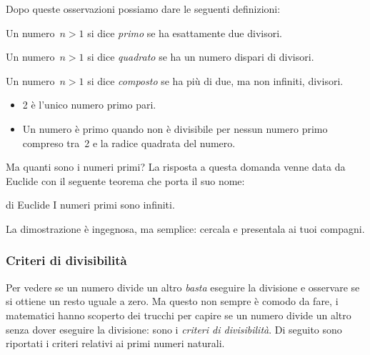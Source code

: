 Dopo queste osservazioni possiamo dare le seguenti definizioni:

\begin{definizione}{}{}
 Un numero~\(n>1\) si dice \emph{primo} se ha esattamente due divisori. 
\end{definizione}

\begin{definizione}{}{}
 Un numero~\(n>1\) si dice \emph{quadrato} se ha un numero dispari di 
divisori. 
\end{definizione}

\begin{definizione}{}{}
 Un numero~\(n>1\) si dice \emph{composto} se ha più di due, ma non infiniti, 
 divisori. 
\end{definizione}


\begin{osservazioni}{}{}
\begin{itemize}
\item 2 è l'unico numero primo pari.
\item Un numero è primo quando non è divisibile per nessun numero 
primo compreso tra~2 e la radice quadrata del numero.
\end{itemize}
\end{osservazioni}


\vspace{1em}
Ma quanti sono i numeri primi? La risposta a questa domanda venne data da 
Euclide con il seguente teorema che porta il suo nome:

\begin{teorema}{di Euclide}{}
I numeri primi sono infiniti.
\end{teorema}

La dimostrazione è ingegnosa, ma semplice: cercala e presentala ai tuoi 
compagni.


\subsubsection{Criteri di divisibilità}
\label{subsec:nat_criteridivisibilita}

Per vedere se un numero divide un altro \emph{basta} eseguire la 
divisione e osservare se si ottiene un resto uguale a zero. 
Ma questo non sempre è comodo da fare, i matematici hanno scoperto dei
trucchi per capire se un numero divide un altro senza dover eseguire 
la divisione: sono i \emph{criteri di divisibilità}. 
Di seguito sono riportati i criteri relativi ai primi numeri naturali.

